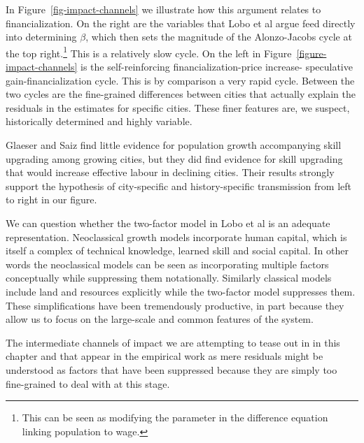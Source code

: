 

 In Figure~\ref{fig-impact-channels} we illustrate how this argument relates to financialization. On the right are the variables that  Lobo et al \cite{loboUrbanScalingProduction2013} argue feed directly into determining $\beta$, which then sets the magnitude of the \gls{Alonzo-Jacobs cycle} at the top right.\footnote{This can be seen as modifying  the parameter in  the difference equation linking population to wage.} This is a relatively slow cycle. On the left in Figure~\ref{figure-impact-channels} is the self-reinforcing financialization-price increase- speculative  gain-financialization cycle. This is by comparison a very rapid cycle. Between the two cycles are the fine-grained differences between cities that actually explain the residuals in the estimates for specific cities. These finer features are, we suspect, historically determined and highly variable.

Glaeser and Saiz \cite{glaeserRiseSkilledCity2003} find little evidence for population growth accompanying skill upgrading among growing cities,  but they did find  evidence for skill upgrading that would increase effective labour in declining cities. Their results strongly  support the hypothesis of city-specific  and history-specific transmission from left to right in our figure.   

We can question whether the two-factor model in Lobo et al is an adequate representation. Neoclassical growth models incorporate human capital, which is itself a complex of technical knowledge, learned  skill and social capital. In other words  the neoclassical models can be seen as incorporating multiple factors conceptually while   suppressing them notationally. Similarly classical models  include land and resources explicitly while the two-factor model suppresses them.  These simplifications have been tremendously productive, in part because they allow us to focus on the large-scale and common features of the  system.  

The intermediate channels of impact we are attempting to tease out  in in this chapter and that appear in the empirical work as mere residuals might be understood as factors that have been suppressed because they are simply too fine-grained to deal with at this stage.

